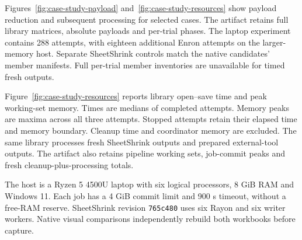 Figures~\ref{fig:case-study-payload} and~\ref{fig:case-study-resources} show payload
reduction and subsequent processing for selected cases. The artifact retains full
library matrices, absolute payloads and per-trial phases. The laptop experiment
contains 288 attempts, with eighteen additional Enron attempts on the larger-memory
host. Separate SheetShrink controls match the native candidates' member manifests.
Full per-trial member inventories are unavailable for timed fresh outputs.

Figure~\ref{fig:case-study-resources} reports library open--save time and peak
working-set memory. Times are medians of completed attempts. Memory peaks are
maxima across all three attempts. Stopped attempts retain their elapsed time and
memory boundary. Cleanup time and coordinator memory are excluded. The same
library processes fresh SheetShrink outputs and prepared external-tool outputs.
The artifact also retains pipeline working sets, job-commit peaks and fresh
cleanup-plus-processing totals.

The host is a Ryzen 5 4500U laptop with six logical processors, 8 GiB RAM and
Windows 11. Each job has a 4 GiB commit limit and 900 s timeout, without a free-RAM
reserve. SheetShrink revision \texttt{765c480} uses six Rayon and six writer
workers. Native visual comparisons independently rebuild both workbooks before
capture.



